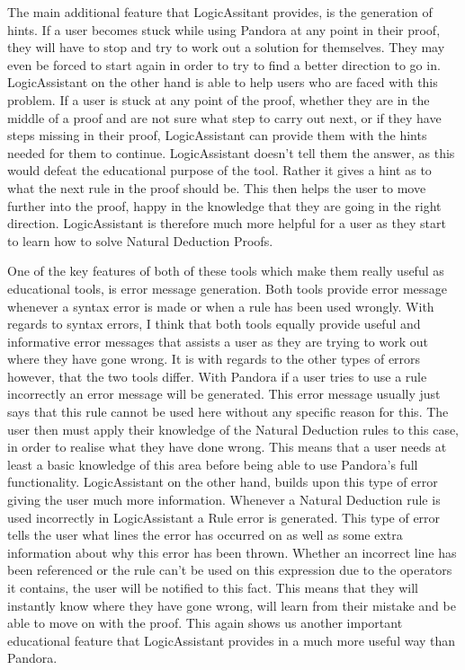 The main additional feature that LogicAssitant provides, is the generation of hints. If a user becomes stuck while using Pandora at any point in their proof, they will have to stop and try to work out a solution for themselves. They may even be forced to start again in order to try to find a better direction to go in. LogicAssistant on the other hand is able to help users who are faced with this problem. If a user is stuck at any point of the proof, whether they are in the middle of a proof and are not sure what step to carry out next, or if they have steps missing in their proof, LogicAssistant can provide them with the hints needed for them to continue. LogicAssistant doesn't tell them the answer, as this would defeat the educational purpose of the tool. Rather it gives a hint as to what the next rule in the proof should be. This then helps the user to move further into the proof, happy in the knowledge that they are going in the right direction. LogicAssistant is therefore much more helpful for a user as they start to learn how to solve Natural Deduction Proofs.

One of the key features of both of these tools which make them really useful as educational tools, is error message generation. Both tools provide error message whenever a syntax error is made or when a rule has been used wrongly. With regards to syntax errors, I think that both tools equally provide useful and informative error messages that assists a user as they are trying to work out where they have gone wrong. It is with regards to the other types of errors however, that the two tools differ. With Pandora if a user tries to use a rule incorrectly an error message will be generated. This error message usually just says that this rule cannot be used here without any specific reason for this. The user then must apply their knowledge of the Natural Deduction rules to this case, in order to realise what they have done wrong. This means that a user needs at least a basic knowledge of this area before being able to use Pandora's full functionality. LogicAssistant on the other hand, builds upon this type of error giving the user much more information. Whenever a Natural Deduction rule is used incorrectly in LogicAssistant a Rule error is generated. This type of error tells the user what lines the error has occurred on as well as some extra information about why this error has been thrown. Whether an incorrect line has been referenced or the rule can't be used on this expression due to the operators it contains, the user will be notified to this fact. This means that they will instantly know where they have gone wrong, will learn from their mistake and be able to move on with the proof. This again shows us another important educational feature that LogicAssistant provides in a much more useful way than Pandora.

